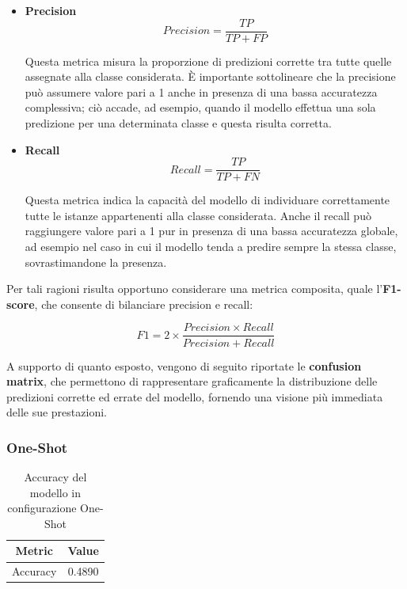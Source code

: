\documentclass[a4paper,12pt]{article}
\begin{document}
\begin{itemize}

    \item \textbf{Precision}
          \[
              Precision = \frac{TP}{TP + FP}
          \]

          Questa metrica misura la proporzione di predizioni corrette tra tutte quelle assegnate alla classe considerata. È importante sottolineare che la precisione può assumere valore pari a 1 anche in presenza di una bassa accuratezza complessiva; ciò accade, ad esempio, quando il modello effettua una sola predizione per una determinata classe e questa risulta corretta.

    \item \textbf{Recall}
          \[
              Recall = \frac{TP}{TP + FN}
          \]

          Questa metrica indica la capacità del modello di individuare correttamente tutte le istanze appartenenti alla classe considerata. Anche il recall può raggiungere valore pari a 1 pur in presenza di una bassa accuratezza globale, ad esempio nel caso in cui il modello tenda a predire sempre la stessa classe, sovrastimandone la presenza.

\end{itemize}

Per tali ragioni risulta opportuno considerare una metrica composita, quale l'\textbf{F1-score}, che consente di bilanciare precision e recall:

\[
    F1 = 2 \times \frac{Precision \times Recall}{Precision + Recall}
\]

A supporto di quanto esposto, vengono di seguito riportate le \textbf{confusion matrix}, che permettono di rappresentare graficamente la distribuzione delle predizioni corrette ed errate del modello, fornendo una visione più immediata delle sue prestazioni.

\subsubsection*{One-Shot}

\begin{table}[H]
    \centering
    \begin{tabular}{cc}
        \toprule
        Metric   & Value  \\
        \midrule
        Accuracy & 0.4890 \\
        \bottomrule
    \end{tabular}
    \caption{Accuracy del modello in configurazione One-Shot}
\end{table}
\end{document}
